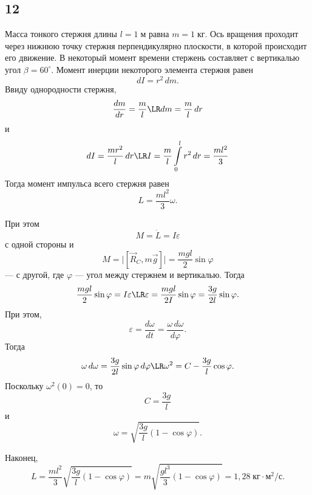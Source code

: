 \subsection{12}

Масса тонкого стержня длины $l=1\;\text{м}$ равна $m=1\;\text{кг}$. Ось вращения проходит через нижнюю точку стержня перпендикулярно плоскости, в которой происходит его движение. В некоторый момент времени стержень составляет с вертикалью угол $\beta=60^\circ$. Момент инерции некоторого элемента стержня равен
\[
dI=r^2\,dm.
\]
Ввиду однородности стержня,
\[
\frac{dm}{dr}=\frac{m}{l}\LR dm=\frac{m}{l}\,dr
\]
и
\[
dI=\frac{mr^2}{l}\,dr\LR I=\frac{m}{l}\int\limits_0^l r^2\,dr=\frac{ml^2}{3}
\]
Тогда момент импульса всего стержня равен
\[
L=\frac{ml^2}{3}\omega.
\]

При этом
\[
M=\dot L=I\varepsilon
\]
с одной стороны и
\[
M=\bigl|[\vec R_C, m\vec g]\bigr|=\frac{mgl}{2}\sin\varphi
\]
--- с другой, где $\varphi$ --- угол между стержнем и вертикалью. Тогда
\[
\frac{mgl}{2}\sin\varphi=I\varepsilon\LR\varepsilon=\frac{mgl}{2I}\sin\varphi=\frac{3g}{2l}\sin\varphi.
\]
При этом,
\[
\varepsilon=\frac{d\omega}{dt}=\frac{\omega\,d\omega}{d\varphi}.
\]
Тогда
\[
\omega\,d\omega=\frac{3g}{2l}\sin\varphi\,d\varphi\LR\omega^2=C-\frac{3g}{l}\cos\varphi.
\]
Поскольку $\omega^2(0)=0$, то
\[
C=\frac{3g}{l}
\]
и
\[
\omega=\sqrt{\frac{3g}{l}(1-\cos\varphi)}.
\]

Наконец,
\[
L=\frac{ml^2}{3}\sqrt{\frac{3g}{l}(1-\cos\varphi)}=m\sqrt{\frac{gl^3}{3}(1-\cos\varphi)}=1{,}28\;\text{кг$\cdot$м$^2$/с}.
\]